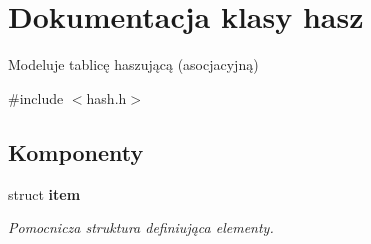 \hypertarget{classhasz}{\section{\-Dokumentacja klasy hasz}
\label{classhasz}
}


\-Modeluje tablicę haszującą (asocjacyjną)  




{\ttfamily \#include $<$hash.\-h$>$}

\subsection*{\-Komponenty}
\begin{DoxyCompactItemize}
\item 
struct {\bfseries item}
\begin{DoxyCompactList}\small\item\em \-Pomocnicza struktura definiująca elementy. \end{DoxyCompactList}\end{DoxyCompactItemize}
